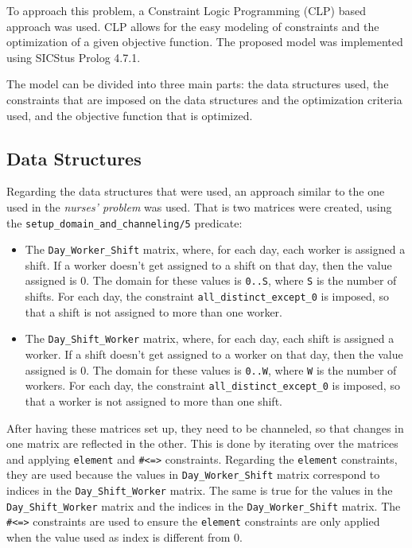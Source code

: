 \documentclass[conference]{IEEEtran}
\begin{document}
To approach this problem, a Constraint Logic Programming (CLP) based approach was used. CLP allows for the easy modeling of constraints and the optimization of a given objective function.
The proposed model was implemented using SICStus Prolog 4.7.1. 

The model can be divided into three main parts: the data structures used, the constraints that are imposed on the data structures and the optimization criteria used, and the objective function that is optimized.

\subsection{Data Structures}
\label{section:data-structures}

Regarding the data structures that were used, an approach similar to the one used in the \textit{nurses' problem} was used. That is two matrices were created, using the \texttt{setup\_domain\_and\_channeling/5} predicate:

\begin{itemize}
    \item {
        The \texttt{Day\_Worker\_Shift} matrix, where, for each day, each worker is assigned a shift. If a worker doesn't get assigned to a shift on that day, then the value assigned is 0.
        The domain for these values is \texttt{0..S}, where \texttt{S} is the number of shifts. For each day, the constraint \texttt{all\_distinct\_except\_0} is imposed, so that a shift is not assigned to more than one worker.
    }
    \item {
        The \texttt{Day\_Shift\_Worker} matrix, where, for each day, each shift is assigned a worker. If a shift doesn't get assigned to a worker on that day, then the value assigned is 0.
        The domain for these values is \texttt{0..W}, where \texttt{W} is the number of workers. For each day, the constraint \texttt{all\_distinct\_except\_0} is imposed, so that a worker is not assigned to more than one shift.
    }
\end{itemize}

After having these matrices set up, they need to be channeled, so that changes in one matrix are reflected in the other.
This is done by iterating over the matrices and applying \texttt{element} and \texttt{\#<=>} constraints. Regarding the \texttt{element} constraints, they are used because the values in \texttt{Day\_Worker\_Shift} matrix correspond to indices in the \texttt{Day\_Shift\_Worker} matrix. The same is true for the values in the \texttt{Day\_Shift\_Worker} matrix and the indices in the \texttt{Day\_Worker\_Shift} matrix. The \texttt{\#<=>} constraints are used to ensure the \texttt{element} constraints are only applied when the value used as index is different from 0.
\end{document}
